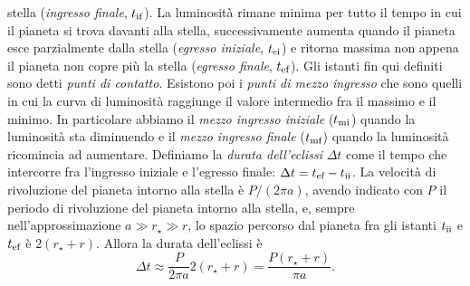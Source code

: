 stella (\emph{ingresso finale}, $t_{\textup{if}}$). La luminosità rimane minima
per tutto il tempo in cui il pianeta si trova davanti alla stella,
successivamente aumenta quando il pianeta esce parzialmente dalla stella
(\emph{egresso iniziale}, $t_{\textup{ei}}$) e ritorna massima non appena il
pianeta non copre più la stella (\emph{egresso finale}, $t_{\textup{ef}}$). Gli
istanti fin qui definiti sono detti \emph{punti di contatto}. Esistono poi i
\emph{punti di mezzo ingresso} che sono quelli in cui la curva di luminosità
raggiunge il valore intermedio fra il massimo e il minimo. In particolare
abbiamo il \emph{mezzo ingresso iniziale} ($t_{\textup{mi}}$) quando la
luminosità sta diminuendo e il \emph{mezzo ingresso finale} ($t_{\textup{mf}}$)
quando la luminosità ricomincia ad aumentare. Definiamo la
\emph{durata dell'eclissi} $\Delta t$ come il tempo che intercorre fra
l'ingresso iniziale e l'egresso finale:
$\Delta t = t_{\textup{ef}} - t_{\textup{ii}}$. La velocità di rivoluzione del
pianeta intorno alla stella è $P/(2\pi a)$, avendo indicato con $P$ il periodo
di rivoluzione del pianeta intorno alla stella, e, sempre nell'approssimazione
$a \gg r_\star \gg r$, lo spazio percorso dal pianeta fra gli istanti
$t_{\textup{ii}}$ e $t_{\textup{ef}}$ è $2(r_\star + r)$. Allora la durata
dell'eclissi è
\begin{equation}
  \Delta t \approx \frac{P}{2\pi a}2(r_\star + r) = \frac{P(r_\star + r)}{\pi
    a}.
\end{equation}

